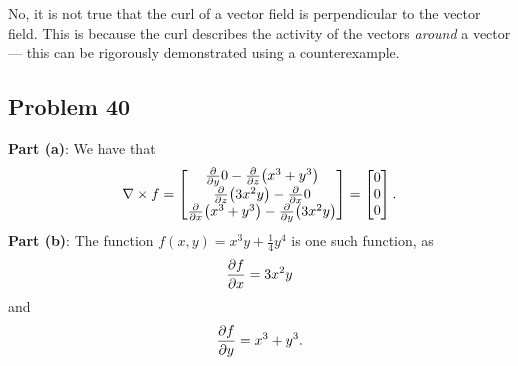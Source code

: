 \documentclass[11pt]{article}
\renewcommand{\grad}{\nabla}
\begin{document}
$\boxed{\text{No}}$, it is not true that the curl of a vector field is perpendicular to the vector field. This is because the curl describes the activity of the vectors \textit{around} a vector --- this can be rigorously demonstrated using a counterexample.


\subsection*{Problem 40}

\textbf{Part (a)}: We have that
\[
	\grad \times f = \begin{bmatrix} \pdv{y} 0 - \pdv{z} (x^{3} + y^{3}) \\ \pdv{z} (3x^{2}y) - \pdv{x} 0 \\ \pdv{x} (x^{3} + y^{3}) - \pdv{y} (3x^{2}y) \end{bmatrix} = \begin{bmatrix} 0 \\ 0 \\ 0 \end{bmatrix}.
\]
\textbf{Part (b)}: The function $f(x, y) = x^{3}y + \tfrac{1}{4}y^{4}$ is one such function, as
\[
	\pdv{f}{x} = 3x^{2}y
\]
and
\[
	\pdv{f}{y} = x^{3} + y^{3}.
\]

\end{document}
